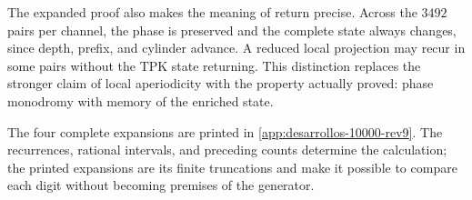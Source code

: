 The expanded proof also makes the meaning of return precise. Across the \(3492\) pairs per channel, the phase is preserved and the complete state always changes, since depth, prefix, and cylinder advance. A reduced local projection may recur in some pairs without the TPK state returning. This distinction replaces the stronger claim of local aperiodicity with the property actually proved: phase monodromy with memory of the enriched state.

The four complete expansions are printed in
\cref{app:desarrollos-10000-rev9}. The recurrences, rational
intervals, and preceding counts determine the calculation; the printed expansions
are its finite truncations and make it possible to compare each digit without
becoming premises of the generator.
